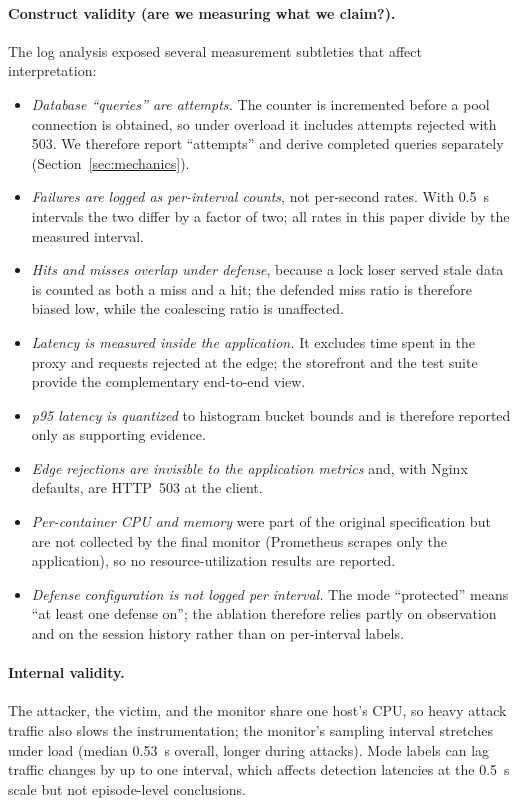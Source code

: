 \paragraph{Construct validity (are we measuring what we claim?).} The log analysis
exposed several measurement subtleties that affect interpretation:
\begin{itemize}[leftmargin=*]
\item \emph{Database ``queries'' are attempts.} The counter is incremented before a
pool connection is obtained, so under overload it includes attempts rejected with 503.
We therefore report ``attempts'' and derive completed queries separately
(Section~\ref{sec:mechanics}).
\item \emph{Failures are logged as per-interval counts}, not per-second rates. With
0.5~s intervals the two differ by a factor of two; all rates in this paper divide by
the measured interval.
\item \emph{Hits and misses overlap under defense}, because a lock loser served stale
data is counted as both a miss and a hit; the defended miss ratio is therefore biased
low, while the coalescing ratio is unaffected.
\item \emph{Latency is measured inside the application.} It excludes time spent in the
proxy and requests rejected at the edge; the storefront and the test suite provide the
complementary end-to-end view.
\item \emph{p95 latency is quantized} to histogram bucket bounds and is therefore
reported only as supporting evidence.
\item \emph{Edge rejections are invisible to the application metrics} and, with Nginx
defaults, are HTTP~503 at the client.
\item \emph{Per-container CPU and memory} were part of the original specification but
are not collected by the final monitor (Prometheus scrapes only the application), so
no resource-utilization results are reported.
\item \emph{Defense configuration is not logged per interval.} The mode ``protected''
means ``at least one defense on''; the ablation therefore relies partly on observation
and on the session history rather than on per-interval labels.
\end{itemize}

\paragraph{Internal validity.} The attacker, the victim, and the monitor share one
host's CPU, so heavy attack traffic also slows the instrumentation; the monitor's
sampling interval stretches under load (median 0.53~s overall, longer during attacks).
Mode labels can lag traffic changes by up to one interval, which affects detection
latencies at the 0.5~s scale but not episode-level conclusions.

